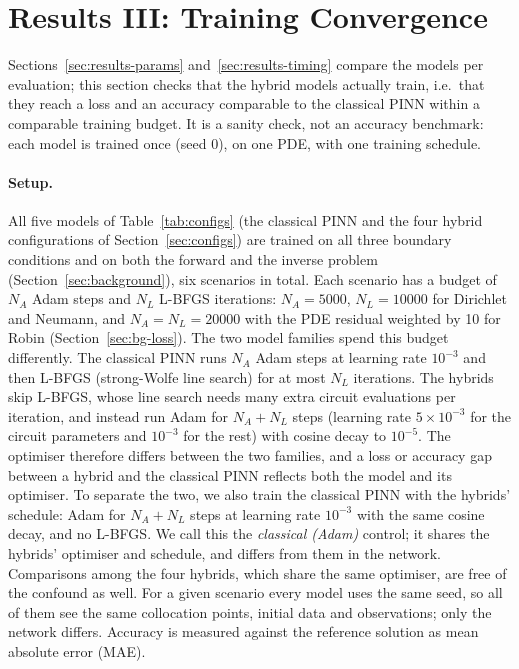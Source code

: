 \section{Results III: Training Convergence}
\label{sec:results-convergence}

Sections~\ref{sec:results-params} and~\ref{sec:results-timing} compare the models per evaluation; this section
checks that the hybrid models actually train, i.e.\ that they reach a loss and an accuracy comparable to the
classical PINN within a comparable training budget. It is a sanity check, not an accuracy benchmark: each
model is trained once (seed 0), on one PDE, with one training schedule.

\paragraph{Setup.}
All five models of Table~\ref{tab:configs} (the classical PINN and the four hybrid configurations of
Section~\ref{sec:configs}) are trained on all three boundary conditions and on both the forward and the inverse
problem (Section~\ref{sec:background}), six scenarios in total. Each scenario has a budget of $N_A$ Adam steps
and $N_L$ L-BFGS iterations: $N_A=5000$, $N_L=10000$ for Dirichlet and Neumann, and $N_A=N_L=20000$ with the
PDE residual weighted by 10 for Robin (Section~\ref{sec:bg-loss}). The two model families spend this budget
differently. The classical PINN runs
$N_A$ Adam steps at learning rate $10^{-3}$ and then L-BFGS (strong-Wolfe line search) for at most $N_L$
iterations. The hybrids skip L-BFGS, whose line search needs many extra circuit evaluations per iteration, and
instead run Adam for $N_A+N_L$ steps (learning rate $5\times10^{-3}$ for the circuit parameters and $10^{-3}$
for the rest) with cosine decay to $10^{-5}$. The optimiser therefore differs between the two families, and a
loss or accuracy gap between a hybrid and the classical PINN reflects both the model and its optimiser. To
separate the two, we also train the classical PINN with the hybrids' schedule: Adam for $N_A+N_L$ steps at
learning rate $10^{-3}$ with the same cosine decay, and no L-BFGS. We call this the \emph{classical (Adam)}
control; it shares the hybrids' optimiser and schedule, and differs from them in the network. Comparisons among
the four hybrids, which share the same optimiser, are free of the confound as well. For a given scenario every
model uses the same seed, so all of them see the same collocation points, initial data and
observations; only the network differs. Accuracy is measured against the reference solution as mean absolute
error (MAE).

